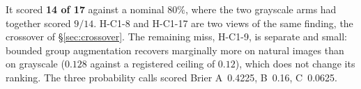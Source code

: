 It scored \textbf{14 of 17} against a nominal $80\%$, where the two grayscale arms had together scored $9/14$. H-C1-8 and H-C1-17 are two views of the same finding, the crossover of \S\ref{sec:crossover}. The remaining miss, H-C1-9, is separate and small: bounded group augmentation recovers marginally more on natural images than on grayscale ($0.128$ against a registered ceiling of $0.12$), which does not change its ranking. The three probability calls scored Brier A~0.4225, B~0.16, C~0.0625.
